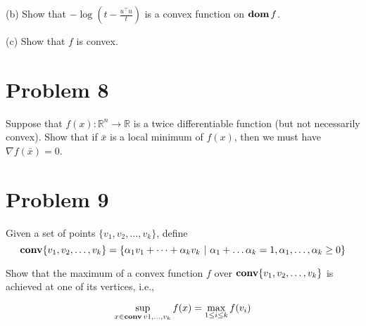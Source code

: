 \documentclass[11pt]{article}
\newcommand{\grad}{\nabla}
\newcommand{\RR}{\mathbb{R}}
\newcommand{\T}{^\top}
\begin{document}
(b) Show that $-\log (t - \frac{u\T u}{t})$ is a convex function on $\mathop{\textbf{dom}} f$.

(c) Show that $f$ is convex.


\clearpage
\section*{Problem 8}
Suppose that $f(x): \RR^n \rightarrow \RR$ is a twice differentiable function (but not necessarily convex). Show that if $\bar x$ is a local minimum of $f(x)$, then we must have $\grad f(\bar x) = 0$.

\clearpage
\section*{Problem 9}
Given a set of points $\{v_1, v_2, \dots, v_k\}$, define
\[
\mathop {\textbf{conv}}\{v_1, v_2, \dots, v_k\} = \{\alpha_1 v_1 + \dots + \alpha_k v_k~|~\alpha_1 + \dots \alpha_k = 1, \alpha_1, \dots, \alpha_k \geq 0\}
\]

Show that the maximum of a convex function $f$ over $\mathop {\textbf{conv}}\{v_1, v_2, \dots, v_k\}$ is achieved at one of its vertices, i.e.,

\[
\sup_{x\in\mathop {\textbf{conv}}{v1, \dots, v_k}} f(x) = \max_{1\leq i \leq k} f(v_i)
\]
\end{document}
